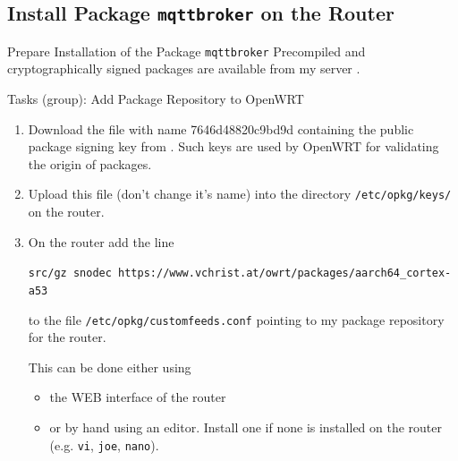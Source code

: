 ﻿\subsection{Install Package \texttt{mqttbroker} on the Router}

\begin{frame}[fragile]{Prepare Installation of the Package \alert{\texttt{mqttbroker}}}
{\href{https://github.com/SNodeC/mqttbroker}{}}
\alert{Precompiled and cryptographically signed packages} are available from \alert{my server} \href{https://www.vchrist.at/owrt}{}.
\begin{exampleblock}{Tasks (group): Add Package Repository to OpenWRT}
\begin{enumerate}
  \item \alert{Download} the file with name \alert{7646d48820c9bd9d} containing the \alert{public} package signing \alert{key} from \href{https://www.vchrist.at/owrt}{}. Such \alert{keys} are used by OpenWRT for \alert{validating} the \alert{origin} of packages.
  \item \alert{Upload} this file (\alert{don't change it's name}) into the directory \alert{\texttt{/etc/opkg/keys/}} on the router.
  \item On the router \alert{add} the line\\
  \begin{alertblock}{}
  \texttt{src/gz snodec https://www.vchrist.at/owrt/packages/aarch64\_cortex-a53}
  \end{alertblock}
    to the file \alert{\texttt{/etc/opkg/customfeeds.conf}} pointing to my \alert{package repository} for the router.
  This can be done either using
  \begin{itemize}
    \item the \alert{WEB interface} of the router
    \item or \alert{by hand} using an \alert{editor}. Install one if none is installed on the router (e.g. \texttt{vi}, \texttt{joe}, \texttt{nano}).
  \end{itemize}
\end{enumerate}
\end{exampleblock}
\end{frame}
